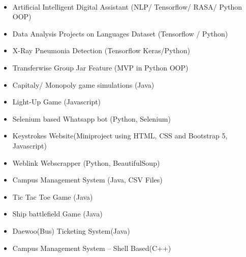 \documentclass[10pt,a4paper,ragged2e,withhyper]{altacv}
\begin{document}
\begin{paracol}{2}










\divider\smallskip



\\


\divider\smallskip


\smallskip



\begin{itemize}
\item Artificial Intelligent Digital Assistant (NLP/ Tensorflow/ RASA/ Python OOP)
\item Data Analysis Projects on Languages Dataset (Tensorflow / Python)
\item X-Ray Pneumonia Detection (Tensorflow Keras/Python)
\item Transferwise Group Jar Feature (MVP in Python OOP)
\item Capitaly/ Monopoly game simulations (Java)
\item Light-Up Game (Javascript)
\item Selenium based Whatsapp bot (Python, Selenium)
\item Keystrokes Website(Miniproject using HTML, CSS and Bootstrap 5, Javascript)
\item Weblink Webscrapper (Python, BeautifulSoup)
\item Campus Management System (Java, CSV Files)
\item Tic Tac Toe Game (Java)
\item Ship battlefield Game (Java)
\item Daewoo(Bus) Ticketing System(Java)
\item Campus Management System -- Shell Based(C++)
\end{itemize}
\divider
{}


\end{paracol}
\end{document}
